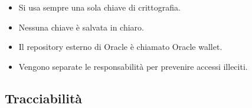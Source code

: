 \begin{itemize}
  \item Si usa sempre una sola chiave di crittografia. 
  \item Nessuna chiave è salvata in chiaro. 
  \item Il repository esterno di Oracle è chiamato Oracle wallet. 
  \item Vengono separate le responsabilità per prevenire accessi illeciti.
\end{itemize}

\subsection{Tracciabilità}









